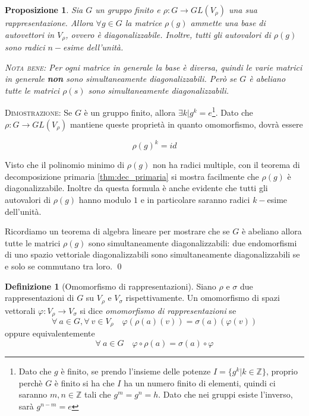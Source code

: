 \documentclass[11pt]{article}
\theoremstyle{plain}
\newtheorem{prop}[thm]{Proposizione}
\theoremstyle{definition}
\newtheorem{defn}{Definizione}[section]
\theoremstyle{remark}
\begin{document}
\begin{prop}
Sia $G$ un gruppo finito e $\rho: G \to GL(V_\rho)$ una sua rappresentazione. Allora $\forall g \in G$ la matrice $\rho(g)$ ammette una base di autovettori in $V_\rho$, ovvero è diagonalizzabile. Inoltre, tutti gli autovalori di $\rho(g)$ sono radici $n-$esime dell'unità.

\textsc{Nota bene:} Per ogni matrice in generale la base è diversa, quindi le varie matrici in generale \textbf{non} sono simultaneamente diagonalizzabili.
Però se $G$ è abeliano tutte le matrici $\rho(s)$ sono simultaneamente diagonalizzabili. 

\label{prop:diagonalizzabilita rappresentazioni}
\end{prop}

\textsc{Dimostrazione:} Se $G$ è un gruppo finito, allora $\exists k | g^k = e$\footnote{Dato che $g$ è finito, se prendo l'insieme delle potenze $I = \{g^k| k\in \mathbb{Z}\}$, proprio perchè $G$ è finito si ha che $I$ ha un numero finito di elementi, quindi ci saranno $m,n \in \mathbb{Z}$ tali che $g^m = g^n = h$. Dato che nei gruppi esiste l'inverso, sarà $g^{n-m} = e$}. Dato che $\rho:G\to GL(V_\rho)$ mantiene queste proprietà in quanto omomorfismo, dovrà essere

\[ \rho(g)^k = id\]

Visto che il polinomio minimo di $\rho(g)$ non ha radici multiple, con il teorema di decomposizione primaria \eqref{thm:dec_primaria} si mostra facilmente che $\rho(g)$ è diagonalizzabile. Inoltre da questa formula è anche evidente che tutti gli autovalori di $\rho(g)$ hanno modulo $1$ e in particolare saranno radici $k-$esime dell'unità.

Ricordiamo un teorema di algebra lineare per mostrare che se $G$ è abeliano allora
tutte le matrici $\rho(g)$ sono simultaneamente diagonalizzabili:
due endomorfismi di uno spazio vettoriale diagonalizzabili sono simultaneamente diagonalizzabili se e solo se commutano tra loro.
\qed




\begin{defn}[Omomorfismo di rappresentazioni]
Siano $\rho$ e $\sigma$ due rappresentazioni di $G$ su $V_{\rho}$ e $V_{\sigma}$ rispettivamente. Un omomorfismo di spazi vettorali $\varphi:V_{\rho}\to V_{\sigma}$ si dice \textit{omomorfismo di rappresentazioni} se
\[
	\forall\ a\in G, \forall\ v\in V_{\rho}\quad \varphi(\rho(a)(v)) = \sigma(a)(\varphi(v))
\]
oppure equivalentemente
\[
	\forall\ a\in G\quad \varphi\circ \rho(a) = \sigma(a)\circ \varphi
\]






\end{defn}
\end{document}
